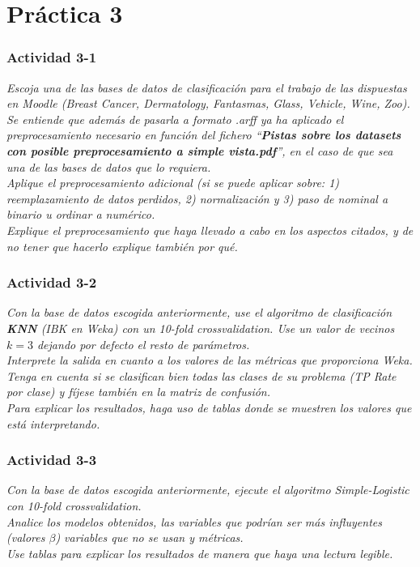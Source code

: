 \part{Práctica 3}
\section{Actividad 3-1}
\label{p31}
\begin{center}
    \parbox{12cm}{\justify\textit{Escoja una de las bases de datos de clasificación para el trabajo de las dispuestas en Moodle (Breast Cancer, Dermatology, Fantasmas, Glass, Vehicle, Wine, Zoo). \\
    Se entiende que además de pasarla a formato .arff ya ha aplicado el preprocesamiento necesario en función del fichero ``\textbf{Pistas sobre los datasets con posible preprocesamiento a simple vista.pdf}'', en el caso de que sea una de las bases de datos que lo requiera.\\
    Aplique el preprocesamiento adicional (si se puede aplicar sobre: 1) reemplazamiento de datos perdidos, 2) normalización y 3) paso de nominal a binario u ordinar a numérico. \\
    Explique el preprocesamiento que haya llevado a cabo en los aspectos citados, y de no tener que hacerlo explique también por qué.}}
\end{center}
\section{Actividad 3-2}
\label{p32}
\begin{center}
    \parbox{12cm}{\justify\textit{Con la base de datos escogida anteriormente, use el algoritmo de clasificación \textbf{KNN} (IBK en Weka) con un 10-fold crossvalidation. Use un valor de vecinos $k=3$ dejando por defecto el resto de parámetros.\\
    Interprete la salida en cuanto a los valores de las métricas que proporciona Weka.\\
    Tenga en cuenta si se clasifican bien todas las clases de su problema (TP Rate por clase) y fíjese también en la matriz de confusión. \\
    Para explicar los resultados, haga uso de tablas donde se muestren los valores que está interpretando.}}
\end{center}
\section{Actividad 3-3}
\label{p33}
\begin{center}
    \parbox{12cm}{\justify\textit{Con la base de datos escogida anteriormente, ejecute el algoritmo Simple-Logistic con 10-fold crossvalidation. \\
    Analice los modelos obtenidos, las variables que podrían ser más influyentes (valores $\beta$) variables que no se usan y métricas. \\
    Use tablas para explicar los resultados de manera que haya una lectura legible.}}
\end{center}